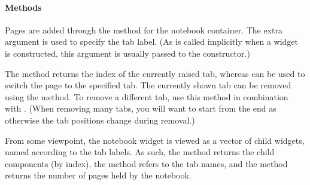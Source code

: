\paragraph{Methods}
Pages are added through the  method for the
notebook container. The extra   argument is used
to specify the tab label. (As  is called implicitly when a
widget is constructed, this argument is usually passed to the
constructor.)



The  method returns the index of the
currently raised tab, whereas  can be
used to switch the page to the specified tab. The currently shown tab
can be removed using the  method. To remove
a different tab, use this method in combination with
. (When removing many tabs, you will want to start
from the end as otherwise the tab positions change during removal.)

From some viewpoint, the notebook widget is viewed as a vector of
child widgets, named according to the tab labels.
As such, the \meth{[} method returns the child
components (by index), the  method refers to
the tab names, and the  method returns the
number of pages held by the notebook.



